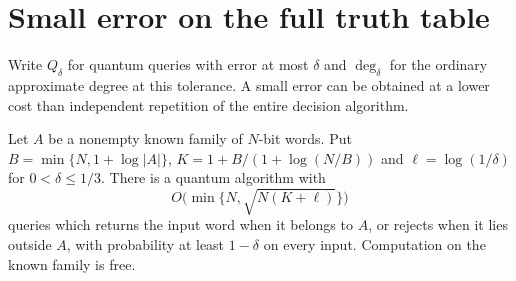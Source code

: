 \section{Small error on the full truth table}\label{sec:confidence}
Write $Q_\delta$ for quantum queries with error at most $\delta$ and $\deg_\delta$ for the ordinary approximate degree at this tolerance. A small error can be obtained at a lower cost than independent repetition of the entire decision algorithm.

\begin{lemma}\label{lem:small-error-oip}
Let $A$ be a nonempty known family of $N$-bit words. Put $B=\min\{N,1+\log|A|\}$, $K=1+B/(1+\log(N/B))$ and $\ell=\log(1/\delta)$ for $0<\delta\le1/3$. There is a quantum algorithm with
\[
                O\bigl(\min\{N,\sqrt{N(K+\ell)}\}\bigr)
\]
queries which returns the input word when it belongs to $A$, or rejects when it lies outside $A$, with probability at least $1-\delta$ on every input. Computation on the known family is free.
\end{lemma}
